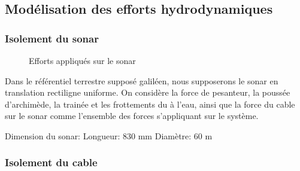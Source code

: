 \documentclass[12pt,a4paper]{report}
\begin{document}
\subsection{Modélisation des efforts hydrodynamiques}


\subsubsection*{Isolement du sonar}

\begin{figure}[H]
\centering
{}
\caption{Efforts appliqués sur le sonar}
\end{figure}

Dans le référentiel terrestre supposé galiléen, nous supposerons le sonar en translation rectiligne uniforme.
On considère la force de pesanteur, la poussée d'archimède, la trainée et les frottements du à l'eau,
ainsi que la force du cable sur le sonar comme l'ensemble des forces s'appliquant sur le système.


Dimension du sonar:
    Longueur: 830 mm
    Diamètre: 60 m


\subsubsection*{Isolement du cable}
\end{document}
